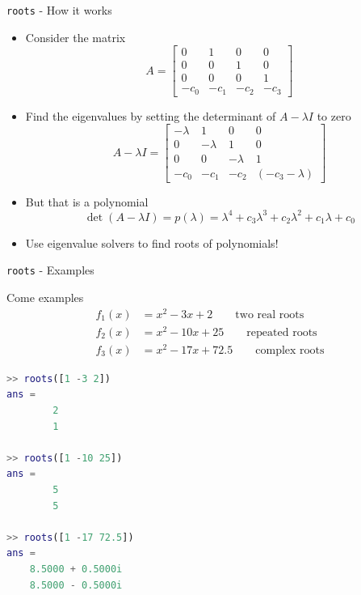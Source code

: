 \documentclass[10pt]{beamer}
\begin{document}
\begin{frame}[shrink]{\texttt{roots} - How it works}
\begin{itemize}
    \item Consider the matrix
    \begin{equation*}
        A = \begin{bmatrix} 0 & 1 & 0 & 0 \\
                            0 & 0 & 1 & 0 \\
                            0 & 0 & 0 & 1 \\
                           -c_0 & -c_1 & -c_2 & -c_3 \end{bmatrix}
    \end{equation*}
\item Find the eigenvalues by setting the determinant of $A-\lambda I$ to zero
    \begin{equation*}
    A -\lambda I= 
       \begin{bmatrix} -\lambda & 1 & 0 & 0 \\
                        0 & -\lambda & 1 & 0 \\
                        0 & 0 & -\lambda & 1 \\
                       -c_0 & -c_1 & -c_2 & (-c_3 - \lambda)\end{bmatrix}
    \end{equation*}
    \item But that is a polynomial 
    $$ \det(A-\lambda I) = p(\lambda) = \lambda^4 + c_3 \lambda^3 + c_2 \lambda^2 + c_1 \lambda + c_0 $$
    \item Use eigenvalue solvers to find roots of polynomials! 
\end{itemize}
\end{frame}


\begin{frame}{\texttt{roots} - Examples}

Come examples
\begin{align*}
    f_1(x) &= x^2 -  3x +  2    \qquad \text{two real roots}\\
    f_2(x) &= x^2 - 10x + 25    \qquad \text{repeated roots}\\
    f_3(x) &= x^2 - 17x + 72.5  \qquad \text{complex roots}
\end{align*}

\begin{lstlisting}[language=matlab]
>> roots([1 -3 2])
ans =
        2
        1

>> roots([1 -10 25])
ans =
        5
        5

>> roots([1 -17 72.5])
ans =
    8.5000 + 0.5000i
    8.5000 - 0.5000i
\end{lstlisting}
\end{frame}
\end{document}
